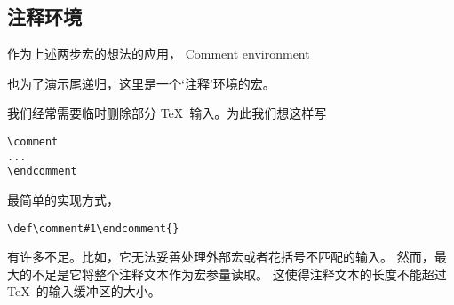 \documentclass{book}
\begin{document}
\subsection{注释环境}

作为上述两步宏的想法的应用，
\howto Comment environment\par
也为了演示尾递归，这里是一个`注释'环境的宏。

我们经常需要临时删除部分 \TeX\ 输入。为此我们想这样写
\begin{verbatim}
\comment
...
\endcomment
\end{verbatim}
最简单的实现方式，
\begin{verbatim}
\def\comment#1\endcomment{}
\end{verbatim} 
有许多不足。比如，它无法妥善处理外部宏或者花括号不匹配的输入。
然而，最大的不足是它将整个注释文本作为宏参量读取。
这使得注释文本的长度不能超过 \TeX\ 的输入缓冲区的大小。
\end{document}
